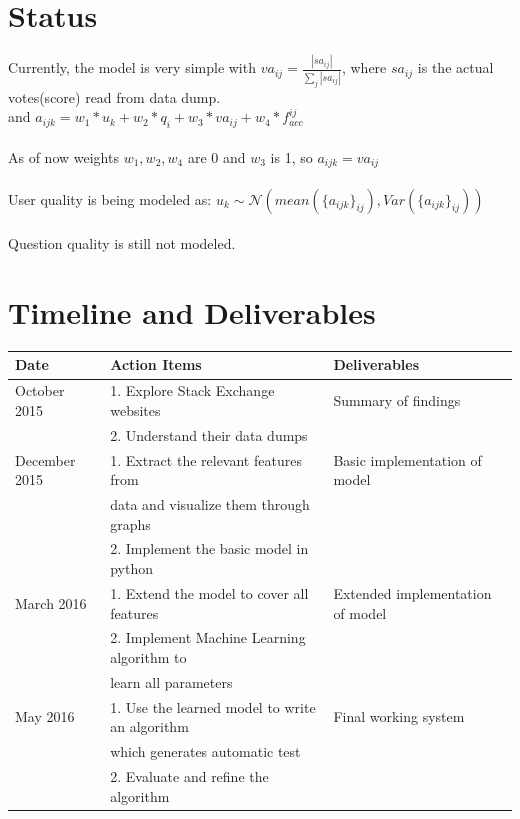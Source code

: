\documentclass{article}
\begin{document}
\section{Status}
Currently, the model is very simple with $va_{ij} = \frac{|sa_{ij}|}{\sum_{j} |sa_{ij}|}$, where $sa_{ij}$ is the actual votes(score) read from data dump.\\
and $a_{ijk} = w_1*u_k + w_2*q_i + w_3*va_{ij} + w_4*f_{acc}^{ij}$ \\
\\
As of now weights $w_1, w_2, w_4$ are 0 and $w_3$ is 1, so $a_{ijk} = va_{ij}$ \\
\\
User quality is being modeled as: $u_k \sim \mathcal{N} (mean(\{a_{ijk}\}_{ij}), Var(\{a_{ijk}\}_{ij}))$ \\
\\
Question quality is still not modeled.

\section{Timeline and Deliverables}
\begin{center}
    \begin{tabular}{||l|l|l||}
        \hline
        \textbf{Date} & \textbf{Action Items} & \textbf{Deliverables} \\
        \hline \hline
        October 2015 & 1. Explore Stack Exchange websites  & Summary of findings\\
                     & 2. Understand their data dumps &\\
        \hline
        December 2015 & 1. Extract the relevant features from & Basic implementation of model\\
                      & data and visualize them through graphs & \\
                      & 2. Implement the basic model in python & \\
        \hline
        March 2016 & 1. Extend the model to cover all features & Extended implementation of model \\
                   & 2. Implement Machine Learning algorithm to & \\ 
                   & learn all parameters & \\
        \hline
        May 2016 & 1. Use the learned model to write an algorithm & Final working system\\
                 & which generates automatic test & \\
                 & 2. Evaluate and refine the algorithm & \\
        \hline
    \end{tabular}
\end{center}
\end{document}
